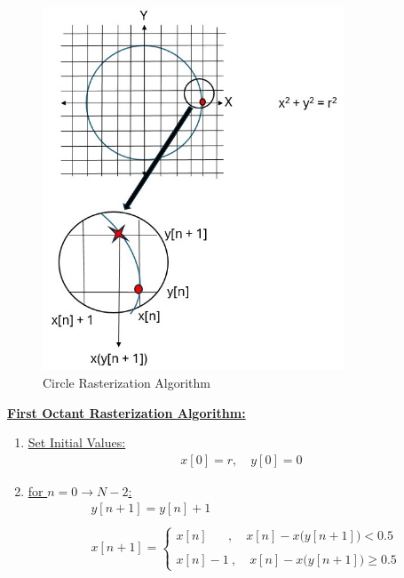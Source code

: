 \documentclass{article}
\begin{document}
\begin{figure}[ht!]
\centering
\includegraphics[width=90mm]{Circle Rasterization.jpg}
\caption{Circle Rasterization Algorithm \label{overflow}}
\end{figure}



\underline{\textbf{First Octant Rasterization Algorithm:}} \\
\begin{enumerate}
    \item \underline{Set Initial Values:} 
          \begin{align*}
                x[0] = r, \quad y[0] = 0 
            \end{align*}
    \item \underline{for $n = 0 \rightarrow N - 2$:} \\
          \begin{align*}
            &y[n + 1] = y[n] + 1 \\ \\
            &x[n + 1] = \begin{cases}
                            x[n] \quad \ \ \ , \quad x[n] - x\Big(y[n + 1]\Big) < 0.5 \\ \\
                            x[n] - 1 \ , \quad x[n] - x\Big(y[n + 1]\Big) \geq 0.5
                          \end{cases}
      \end{align*}
\end{enumerate}
\end{document}
